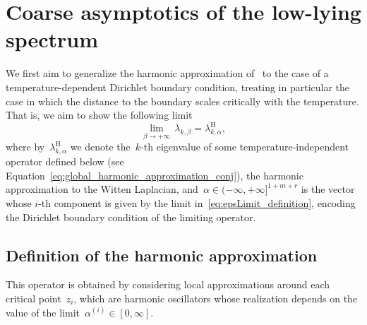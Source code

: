 \documentclass[10pt]{article}
\newcommand{\cL}{\mathcal{L}}
\newcommand{\R}{\mathbb{R}}
\newcommand{\1}{\mathbbm 1}
\newcommand{\epsLimit}[1]{\alpha^{(#1)}} %
\newtheorem{definition}{Definition}
\begin{document}

    \section{Coarse asymptotics of the low-lying spectrum}
    We first aim to generalize the harmonic approximation of~\cite{S83} to the case of a temperature-dependent Dirichlet boundary condition, treating in particular the case in which the distance to the boundary scales critically with the temperature.
    That is, we aim to show the following limit
   ~$$\underset{\beta\to+\infty}{\lim}\,\lambda_{k,\beta} = \lambda_{k,\alpha}^{\mathrm H},$$
    where by~$\lambda_{k,\alpha}^{\mathrm H}$ we denote the~$k$-th eigenvalue of some temperature-independent operator defined below (see Equation~\eqref{eq:global_harmonic_approximation_conj}), the harmonic approximation to the Witten Laplacian, and~$\alpha\in(-\infty,+\infty]^{1+m+r}$ is the vector whose $i$-th component is given by the limit in~\eqref{eq:epsLimit_definition}, encoding the Dirichlet boundary condition of the limiting operator.
    \subsection{Definition of the harmonic approximation}
    This operator is obtained by considering local approximations around each critical point~$z_i$, which are harmonic oscillators whose realization depends on the value of the limit~$\epsLimit{i} \in [0,\infty]$.
\end{document}

